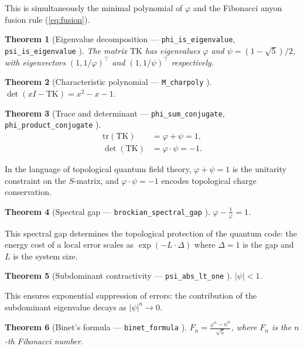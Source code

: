 \documentclass[11pt,a4paper]{article}
\newtheorem{theorem}{Theorem}[section]
\newcommand{\lean}[1]{\texttt{\small #1}}
\newcommand{\verified}{\textcolor{green!60!black}{\checkmark}}
\begin{document}
This is simultaneously the minimal polynomial of $\varphi$ and the
Fibonacci anyon fusion rule (\ref{eq:fusion}).

\begin{theorem}[Eigenvalue decomposition --- \lean{phi\_is\_eigenvalue}, \lean{psi\_is\_eigenvalue} \verified]\label{thm:eigen}
  The matrix $\mathrm{TK}$ has eigenvalues $\varphi$ and $\psi = (1-\sqrt{5})/2$,
  with eigenvectors $(1, 1/\varphi)^\top$ and $(1, 1/\psi)^\top$ respectively.
\end{theorem}

\begin{theorem}[Characteristic polynomial --- \lean{M\_charpoly} \verified]\label{thm:charpoly}
  $\det(xI - \mathrm{TK}) = x^2 - x - 1$.
\end{theorem}

\begin{theorem}[Trace and determinant --- \lean{phi\_sum\_conjugate}, \lean{phi\_product\_conjugate} \verified]\label{thm:trace}
  \begin{align}
    \mathrm{tr}(\mathrm{TK}) &= \varphi + \psi = 1, \\
    \det(\mathrm{TK}) &= \varphi \cdot \psi = -1.
  \end{align}
\end{theorem}

In the language of topological quantum field theory, $\varphi + \psi = 1$
is the unitarity constraint on the $S$-matrix, and $\varphi \cdot \psi = -1$
encodes topological charge conservation.

\begin{theorem}[Spectral gap --- \lean{brockian\_spectral\_gap} \verified]\label{thm:gap}
  $\varphi - \frac{1}{\varphi} = 1$.
\end{theorem}

This spectral gap determines the topological protection of the quantum code:
the energy cost of a local error scales as $\exp(-L \cdot \Delta)$ where
$\Delta = 1$ is the gap and $L$ is the system size.

\begin{theorem}[Subdominant contractivity --- \lean{psi\_abs\_lt\_one} \verified]\label{thm:contract}
  $|\psi| < 1$.
\end{theorem}

This ensures exponential suppression of errors: the contribution of the
subdominant eigenvalue decays as $|\psi|^n \to 0$.

\begin{theorem}[Binet's formula --- \lean{binet\_formula} \verified]\label{thm:binet}
  $F_n = \frac{\varphi^n - \psi^n}{\sqrt{5}}$,
  where $F_n$ is the $n$-th Fibonacci number.
\end{theorem}
\end{document}
